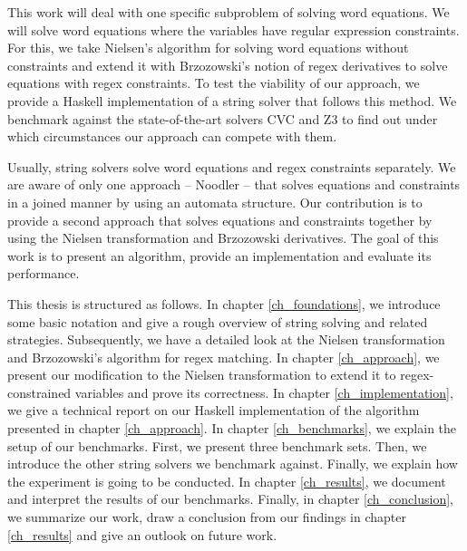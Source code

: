 This work will deal with one specific subproblem of solving word equations. We will solve word equations where the variables have regular expression constraints. For this, we take Nielsen's algorithm \cite{nielsen1917} for solving word equations without constraints and extend it with Brzozowski's notion of regex derivatives \cite{brzozowski} to solve equations with regex constraints.
To test the viability of our approach, we provide a Haskell implementation of a string solver that follows this method. We benchmark against the state-of-the-art solvers CVC \cite{cvc4,cvc5} and Z3 \cite{z3} to find out under which circumstances our approach can compete with them.

Usually, string solvers solve word equations and regex constraints separately. We are aware of only one approach -- Noodler \cite{noodler} -- that solves equations and constraints in a joined manner by using an automata structure. Our contribution is to provide a second approach that solves equations and constraints together by using the Nielsen transformation and Brzozowski derivatives. The goal of this work is to present an algorithm, provide an implementation and evaluate its performance.

This thesis is structured as follows. In chapter \ref{ch_foundations}, we introduce some basic notation and give a rough overview of string solving and related strategies. Subsequently, we have a detailed look at the Nielsen transformation and Brzozowski's algorithm for regex matching.
In chapter \ref{ch_approach}, we present our modification to the Nielsen transformation to extend it to regex-constrained variables and prove its correctness.
In chapter \ref{ch_implementation}, we give a technical report on our Haskell implementation of the algorithm presented in chapter \ref{ch_approach}.
In chapter \ref{ch_benchmarks}, we explain the setup of our benchmarks. First, we present three benchmark sets. Then, we introduce the other string solvers we benchmark against. Finally, we explain how the experiment is going to be conducted.
In chapter \ref{ch_results}, we document and interpret the results of our benchmarks.
Finally, in chapter \ref{ch_conclusion}, we summarize our work, draw a conclusion from our findings in chapter \ref{ch_results} and give an outlook on future work.
